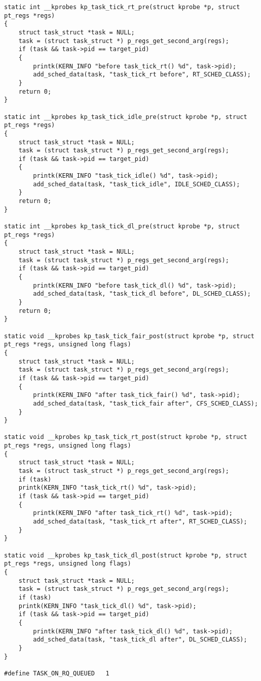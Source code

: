\begin{lstlisting}[label=lst:all_code,caption=Загружаемый модуль ядра]
static int __kprobes kp_task_tick_rt_pre(struct kprobe *p, struct pt_regs *regs) 
{
	struct task_struct *task = NULL;
	task = (struct task_struct *) p_regs_get_second_arg(regs);
	if (task && task->pid == target_pid)
	{
		printk(KERN_INFO "before task_tick_rt() %d", task->pid);
		add_sched_data(task, "task_tick_rt before", RT_SCHED_CLASS);
	}
	return 0;
}

static int __kprobes kp_task_tick_idle_pre(struct kprobe *p, struct pt_regs *regs) 
{
	struct task_struct *task = NULL;
	task = (struct task_struct *) p_regs_get_second_arg(regs);
	if (task && task->pid == target_pid)
	{
		printk(KERN_INFO "task_tick_idle() %d", task->pid);
		add_sched_data(task, "task_tick_idle", IDLE_SCHED_CLASS);
	}
	return 0;
}

static int __kprobes kp_task_tick_dl_pre(struct kprobe *p, struct pt_regs *regs) 
{
	struct task_struct *task = NULL;
	task = (struct task_struct *) p_regs_get_second_arg(regs);
	if (task && task->pid == target_pid)
	{
		printk(KERN_INFO "before task_tick_dl() %d", task->pid);
		add_sched_data(task, "task_tick_dl before", DL_SCHED_CLASS);
	}
	return 0;
}

static void __kprobes kp_task_tick_fair_post(struct kprobe *p, struct pt_regs *regs, unsigned long flags) 
{
	struct task_struct *task = NULL;
	task = (struct task_struct *) p_regs_get_second_arg(regs);
	if (task && task->pid == target_pid)
	{
		printk(KERN_INFO "after task_tick_fair() %d", task->pid);
		add_sched_data(task, "task_tick_fair after", CFS_SCHED_CLASS);
	}
}

static void __kprobes kp_task_tick_rt_post(struct kprobe *p, struct pt_regs *regs, unsigned long flags) 
{
	struct task_struct *task = NULL;
	task = (struct task_struct *) p_regs_get_second_arg(regs);
	if (task)
	printk(KERN_INFO "task_tick_rt() %d", task->pid);
	if (task && task->pid == target_pid)
	{
		printk(KERN_INFO "after task_tick_rt() %d", task->pid);
		add_sched_data(task, "task_tick_rt after", RT_SCHED_CLASS);
	}
}

static void __kprobes kp_task_tick_dl_post(struct kprobe *p, struct pt_regs *regs, unsigned long flags) 
{
	struct task_struct *task = NULL;
	task = (struct task_struct *) p_regs_get_second_arg(regs);
	if (task)
	printk(KERN_INFO "task_tick_dl() %d", task->pid);
	if (task && task->pid == target_pid)
	{
		printk(KERN_INFO "after task_tick_dl() %d", task->pid);
		add_sched_data(task, "task_tick_dl after", DL_SCHED_CLASS);
	}
}

#define TASK_ON_RQ_QUEUED	1


\end{lstlisting}
